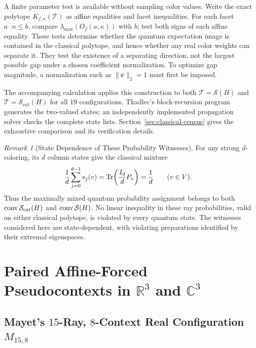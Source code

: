 \documentclass[aps,pra,reprint,superscriptaddress,longbibliography,nofootinbib,floatfix,10pt]{revtex4-2}
\theoremstyle{definition}\newtheorem{definition}[theorem]{Definition}
\theoremstyle{remark}\newtheorem{remark}[theorem]{Remark}
\newcommand{\C}{\mathbb C}\newcommand{\R}{\mathbb R}\newcommand{\Q}{\mathbb Q}
\newcommand{\Sc}{\mathcal S}\newcommand{\Cc}{\mathcal C}\newcommand{\Wc}{\mathcal W}
\begin{document}
A finite parameter test is available without sampling color values. Write the exact polytope $K_{f,\kappa}(\mathcal T)$ as affine equalities and facet inequalities. For each facet $a\cdot n\le b$, compare $\lambda_{\max}(O_f(a;\kappa))$ with $b$; test both signs of each affine equality. These tests determine whether the quantum expectation image is contained in the classical polytope, and hence whether any real color weights can separate it. They test the existence of a separating direction, not the largest possible gap under a chosen coefficient normalization. To optimize gap magnitude, a normalization such as $\|\mathbf c\|_2=1$ must first be imposed.

The accompanying calculation applies this construction to both $\mathcal T=\Sc(H)$ and $\mathcal T=\Sc_{\mathrm{ext}}(H)$ for all $19$ configurations. Tkadlec's block-recursion program~\cite{tkadlec-2states-2017} generates the two-valued states; an independently implemented propagation solver checks the complete state lists. Section~\ref{sec:classical-census} gives the exhaustive comparison and its verification details.

\begin{remark}[State Dependence of These Probability Witnesses]\label{rem:state-dependent-witnesses}
For any strong $d$-coloring, its $d$ column states give the classical mixture
\begin{equation}\label{eq:classical-maximally-mixed-point}
\frac1d\sum_{j=0}^{d-1}s_j(v)
=\operatorname{Tr}\!\left(\frac{I_d}{d}P_v\right)=\frac1d
\qquad(v\in V).
\end{equation}
Thus the maximally mixed quantum probability assignment belongs to both $\conv\Sc_{\mathrm{ext}}(H)$ and $\conv\Sc(H)$. No linear inequality in these ray probabilities, valid on either classical polytope, is violated by every quantum state. The witnesses considered here are state-dependent, with violating preparations identified by their extremal eigenspaces.
\end{remark}

\section{Paired Affine-Forced Pseudocontexts in \texorpdfstring{$\R^3$ and $\C^3$}{R3 and C3}}\label{sec:paired-affine}

\subsection{Mayet's \texorpdfstring{$15$}{15}-Ray, \texorpdfstring{$8$}{8}-Context Real Configuration \texorpdfstring{$M_{15,8}$}{M15,8}}\label{sec:mayet}
\end{document}
